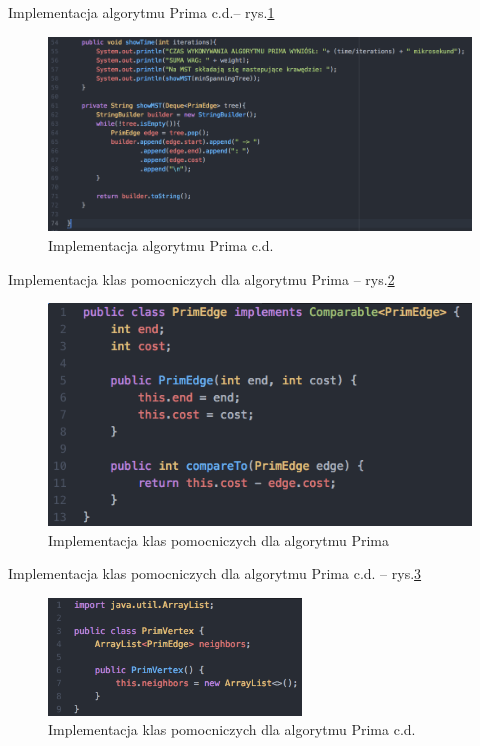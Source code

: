 Implementacja algorytmu Prima c.d.-- rys.\ref{fig: lp2}
\begin{figure}[htb!]
	\centering
	\includegraphics[width=1\textwidth]{tex/fig/lp2}
	\caption{Implementacja algorytmu Prima c.d.}
	\label{fig: lp2}
\end{figure}

Implementacja klas pomocniczych dla algorytmu Prima  -- rys.\ref{fig: lp3}
\begin{figure}[htb!]
	\centering
	\includegraphics[width=1\textwidth]{tex/fig/lp3}
	\caption{Implementacja klas pomocniczych dla algorytmu Prima}
	\label{fig: lp3}
\end{figure}
\newpage
Implementacja klas pomocniczych dla algorytmu Prima c.d. -- rys.\ref{fig: lp4}
\begin{figure}[htb!]
	\centering
	\includegraphics[width=0.6\textwidth]{tex/fig/lp4}
	\caption{Implementacja klas pomocniczych dla algorytmu Prima c.d.}
	\label{fig: lp4}
\end{figure}

